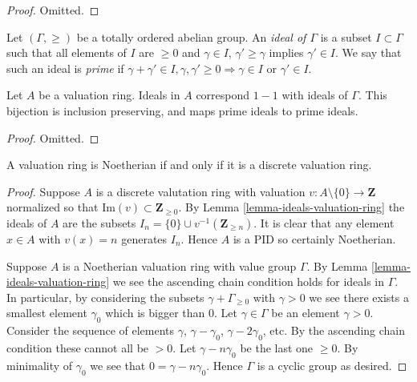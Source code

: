 \begin{proof}
Omitted.
\end{proof}

\noindent
Let $(\Gamma, \geq)$ be a totally ordered abelian group.
An {\it ideal of $\Gamma$} is a subset $I \subset \Gamma$ such
that all elements of $I$ are $\geq 0$ and $\gamma \in I$,
$\gamma' \geq \gamma$ implies $\gamma' \in I$. We say that such
an ideal is {\it prime} if $\gamma + \gamma' \in I, \gamma, \gamma' \geq 0
\Rightarrow \gamma \in I \text{ or } \gamma' \in I$.

\begin{lemma}
\label{lemma-ideals-valuation-ring}
Let $A$ be a valuation ring.
Ideals in $A$ correspond $1 - 1$ with ideals of $\Gamma$.
This bijection is inclusion preserving, and maps prime
ideals to prime ideals.
\end{lemma}

\begin{proof}
Omitted.
\end{proof}

\begin{lemma}
\label{lemma-valuation-ring-Noetherian-discrete}
A valuation ring is Noetherian if and only if it is
a discrete valuation ring.
\end{lemma}

\begin{proof}
Suppose $A$ is a discrete valutation ring
with valuation $v : A \setminus \{0\} \to \mathbf{Z}$
normalized so that $\text{Im}(v) \subset \mathbf{Z}_{\geq 0}$.
By Lemma \ref{lemma-ideals-valuation-ring} the ideals of $A$ are the subsets
$I_n = \{0\} \cup v^{-1}(\mathbf{Z}_{\geq n})$. It is clear
that any element $x \in A$ with $v(x) = n$ generates $I_n$.
Hence $A$ is a PID so certainly Noetherian.

\medskip\noindent
Suppose $A$ is a Noetherian valuation ring with value group $\Gamma$.
By Lemma \ref{lemma-ideals-valuation-ring} we see the ascending chain
condition holds for ideals in $\Gamma$. In particular, by considering
the subsets $\gamma + \Gamma_{\geq 0}$ with $\gamma > 0$ we see
there exists a smallest element $\gamma_0$ which is bigger than $0$.
Let $\gamma \in \Gamma$ be an element $\gamma > 0$. Consider the sequence
of elements $\gamma$, $\gamma - \gamma_0$, $\gamma - 2\gamma_0$,
etc. By the ascending chain condition these cannot all be $> 0$.
Let $\gamma - n \gamma_0$ be the last one $\geq 0$. By minimality
of $\gamma_0$ we see that $0 = \gamma - n \gamma_0$. Hence $\Gamma$
is a cyclic group as desired.
\end{proof}























